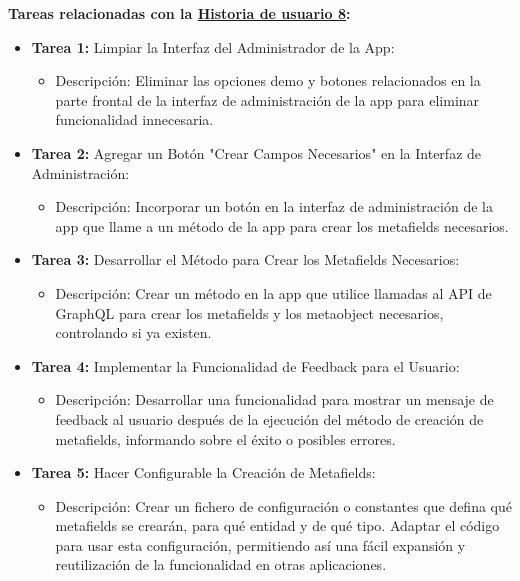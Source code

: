\documentclass[12pt]{article}
\begin{document}
\textbf{Tareas relacionadas con la \hyperref[sec:historia8]{Historia de usuario 8}:}
\begin{itemize}
    \item \textbf{Tarea 1:} Limpiar la Interfaz del Administrador de la App:
          \begin{itemize}[label=--]
              \item Descripción: Eliminar las opciones demo y botones relacionados en la parte frontal de la interfaz de administración de la app para eliminar funcionalidad innecesaria.
          \end{itemize}
    \item \textbf{Tarea 2:} Agregar un Botón "Crear Campos Necesarios" en la Interfaz de Administración:
          \begin{itemize}[label=--]
              \item Descripción: Incorporar un botón en la interfaz de administración de la app que llame a un método de la app para crear los metafields necesarios.
          \end{itemize}
    \item \textbf{Tarea 3:} Desarrollar el Método para Crear los Metafields Necesarios:
          \begin{itemize}[label=--]
              \item Descripción: Crear un método en la app que utilice llamadas al API de GraphQL para crear los metafields y los metaobject necesarios, controlando si ya existen.
          \end{itemize}
    \item \textbf{Tarea 4:} Implementar la Funcionalidad de Feedback para el Usuario:
          \begin{itemize}[label=--]
              \item Descripción: Desarrollar una funcionalidad para mostrar un mensaje de feedback al usuario después de la ejecución del método de creación de metafields, informando sobre el éxito o posibles errores.
          \end{itemize}
    \item \textbf{Tarea 5:} Hacer Configurable la Creación de Metafields:
          \begin{itemize}[label=--]
              \item Descripción: Crear un fichero de configuración o constantes que defina qué metafields se crearán, para qué entidad y de qué tipo. Adaptar el código para usar esta configuración, permitiendo así una fácil expansión y reutilización de la funcionalidad en otras aplicaciones.

\end{itemize}
\end{itemize}
\end{document}
